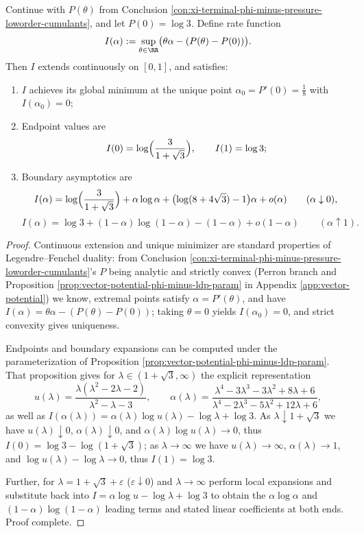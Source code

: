 \begin{conclusion}\label{con:xi-terminal-phi-minus-rate-endpoints-boundary-asymptotics}
Continue with \(P(\theta)\) from Conclusion \ref{con:xi-terminal-phi-minus-pressure-loworder-cumulants}, and let \(P(0)=\log 3\).
Define rate function
\[
I(\alpha):=\sup_{\theta\in\RR}\bigl(\theta\alpha-(P(\theta)-P(0))\bigr).
\]
Then \(I\) extends continuously on \([0,1]\), and satisfies:
\begin{enumerate}
  \item \(I\) achieves its global minimum at the unique point \(\alpha_{0}=P'(0)=\frac18\) with \(I(\alpha_{0})=0\);
  \item Endpoint values are
  \[
  I(0)=\log\Bigl(\frac{3}{1+\sqrt3}\Bigr),\qquad
  I(1)=\log 3;
  \]
  \item Boundary asymptotics are
  \[
  I(\alpha)=\log\Bigl(\frac{3}{1+\sqrt3}\Bigr)+\alpha\log\alpha+\bigl(\log(8+4\sqrt3)-1\bigr)\alpha+o(\alpha)
  \qquad (\alpha\downarrow 0),
  \]
  \[
  I(\alpha)=\log 3+(1-\alpha)\log(1-\alpha)-(1-\alpha)+o(1-\alpha)
  \qquad (\alpha\uparrow 1).
  \]
\end{enumerate}
\end{conclusion}
\begin{proof}[Proof]
Continuous extension and unique minimizer are standard properties of Legendre--Fenchel duality: from Conclusion \ref{con:xi-terminal-phi-minus-pressure-loworder-cumulants}'s \(P\) being analytic and strictly convex (Perron branch and Proposition \ref{prop:vector-potential-phi-minus-ldp-param} in Appendix \ref{app:vector-potential}) we know,
extremal points satisfy \(\alpha=P'(\theta)\), and have \(I(\alpha)=\theta\alpha-(P(\theta)-P(0))\);
taking \(\theta=0\) yields \(I(\alpha_{0})=0\), and strict convexity gives uniqueness.
\par
Endpoints and boundary expansions can be computed under the parameterization of Proposition \ref{prop:vector-potential-phi-minus-ldp-param}.
That proposition gives for \(\lambda\in(1+\sqrt3,\infty)\) the explicit representation
\[
u(\lambda)=\frac{\lambda(\lambda^{2}-2\lambda-2)}{\lambda^{2}-\lambda-3},
\qquad
\alpha(\lambda)=\frac{\lambda^{4}-3\lambda^{3}-3\lambda^{2}+8\lambda+6}{\lambda^{4}-2\lambda^{3}-5\lambda^{2}+12\lambda+6},
\]
as well as
\(
I(\alpha(\lambda))=\alpha(\lambda)\log u(\lambda)-\log\lambda+\log 3
\).
As \(\lambda\downarrow 1+\sqrt3\) we have \(u(\lambda)\downarrow 0\), \(\alpha(\lambda)\downarrow 0\), and
\(
\alpha(\lambda)\log u(\lambda)\to 0
\), thus
\(
I(0)=\log 3-\log(1+\sqrt3)
\);
as \(\lambda\to\infty\) we have \(u(\lambda)\to\infty\), \(\alpha(\lambda)\to 1\), and \(\log u(\lambda)-\log\lambda\to 0\), thus \(I(1)=\log 3\).
\par
Further, for \(\lambda=1+\sqrt3+\varepsilon\) (\(\varepsilon\downarrow 0\)) and \(\lambda\to\infty\) perform local expansions and substitute back into
\(
I=\alpha\log u-\log\lambda+\log 3
\) to obtain the
\(\alpha\log\alpha\) and \((1-\alpha)\log(1-\alpha)\) leading terms and stated linear coefficients at both ends. Proof complete.
\end{proof}

